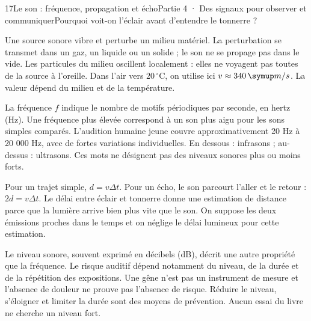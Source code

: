 \begin{ouverture}[college4]{17}{Le son : fréquence, propagation et écho}{Partie 4 · Des signaux pour observer et communiquer}{Pourquoi voit-on l’éclair avant d’entendre le tonnerre ?}
\end{ouverture}
\label{ess-17}
Une source sonore vibre et perturbe un milieu matériel. La perturbation se transmet dans un gaz, un liquide ou un solide ; le son ne se propage pas dans le vide. Les particules du milieu oscillent localement : elles ne voyagent pas toutes de la source à l’oreille. Dans l’air vers $20\,^{\circ}\mathrm C$, on utilise ici $v\approx340\unite{m/s}$. La valeur dépend du milieu et de la température.\par
{}
La fréquence $f$ indique le nombre de motifs périodiques par seconde, en hertz (Hz). Une fréquence plus élevée correspond à un son plus aigu pour les sons simples comparés. L’audition humaine jeune couvre approximativement 20 Hz à 20 000 Hz, avec de fortes variations individuelles. En dessous : infrasons ; au-dessus : ultrasons. Ces mots ne désignent pas des niveaux sonores plus ou moins forts.\par
\clearpage
{}
Pour un trajet simple, $d=v\Delta t$. Pour un écho, le son parcourt l’aller et le retour : $2d=v\Delta t$. Le délai entre éclair et tonnerre donne une estimation de distance parce que la lumière arrive bien plus vite que le son. On suppose les deux émissions proches dans le temps et on néglige le délai lumineux pour cette estimation.\par
{}
Le niveau sonore, souvent exprimé en décibels (dB), décrit une autre propriété que la fréquence. Le risque auditif dépend notamment du niveau, de la durée et de la répétition des expositions. Une gêne n’est pas un instrument de mesure et l’absence de douleur ne prouve pas l’absence de risque. Réduire le niveau, s’éloigner et limiter la durée sont des moyens de prévention. Aucun essai du livre ne cherche un niveau fort.\par
